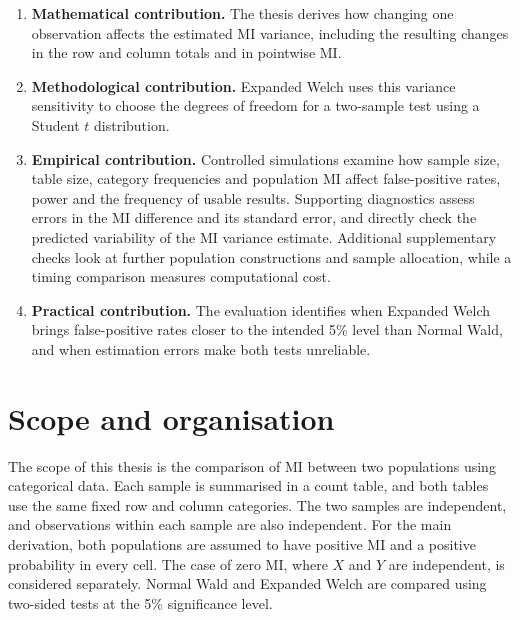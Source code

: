 \begin{enumerate}
  \item \begin{samepage}\textbf{Mathematical contribution.} The thesis derives how changing
  one observation affects the estimated MI variance, including the resulting
  changes in the row and column totals and in pointwise MI.
  \par
  \end{samepage}

  \item \begin{samepage}\textbf{Methodological contribution.} Expanded Welch uses this
  variance sensitivity to choose the degrees of freedom for a two-sample
  test using a Student \(t\) distribution.
  \par
  \end{samepage}

  \item \begin{samepage}\textbf{Empirical contribution.} Controlled simulations examine
  how sample size, table size, category frequencies and population MI affect
  false-positive rates, power and the frequency of usable results. Supporting
  diagnostics assess errors in the MI difference and its standard error, and
  directly check the predicted variability of the MI variance estimate.
  Additional supplementary checks look at further population constructions
  and sample allocation, while a timing comparison measures computational cost.
  \par
  \end{samepage}

  \item \textbf{Practical contribution.} The evaluation identifies
  when Expanded Welch brings false-positive rates closer to the intended
  5\% level than Normal Wald, and when estimation errors make both tests
  unreliable.
\end{enumerate}

\section{Scope and organisation}

The scope of this thesis is the comparison of MI between two populations
using categorical data. Each sample is summarised in a count table, and
both tables use the same fixed row and column categories. The two samples
are independent, and observations within each sample are also independent.
For the main derivation, both populations are assumed to have positive MI
and a positive probability in every cell. The case of zero MI, where
\(X\) and \(Y\) are independent, is considered separately.
Normal Wald and Expanded Welch are compared using two-sided tests at the
5\% significance level.

